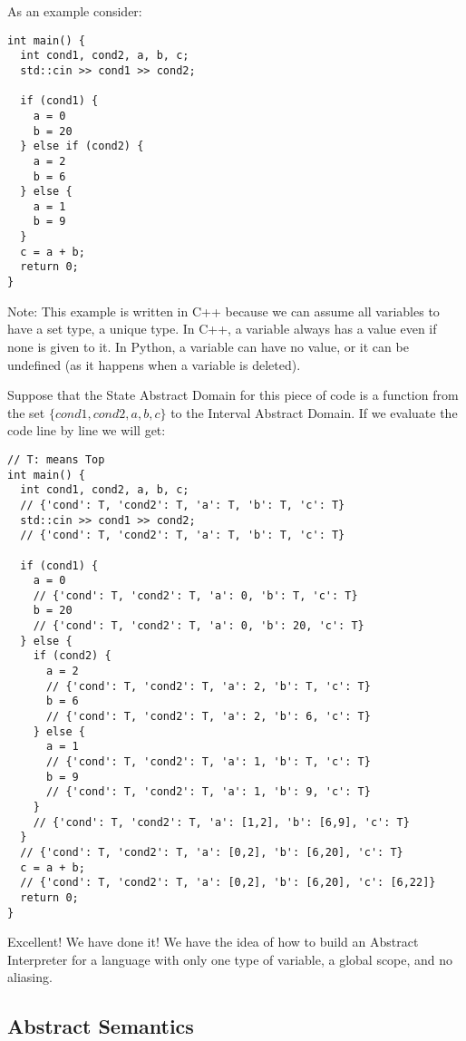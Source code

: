 As an example consider:

\begin{verbatim}
int main() {
  int cond1, cond2, a, b, c;
  std::cin >> cond1 >> cond2;

  if (cond1) {
    a = 0
    b = 20
  } else if (cond2) {
    a = 2
    b = 6
  } else {
    a = 1
    b = 9
  }
  c = a + b;
  return 0;
}
\end{verbatim}

Note: This example is written in C++ because we can assume all variables
to have a set type, a unique type. In C++, a variable always has a value
even if none is given to it. In Python, a variable can have no value, or
it can be undefined (as it happens when a variable is deleted).

Suppose that the State Abstract Domain for this piece of code is a
function from the set \(\{cond1, cond2, a, b, c\}\) to the Interval
Abstract Domain. If we evaluate the code line by line we will get:

\begin{verbatim}
// T: means Top
int main() {
  int cond1, cond2, a, b, c;
  // {'cond': T, 'cond2': T, 'a': T, 'b': T, 'c': T}
  std::cin >> cond1 >> cond2;
  // {'cond': T, 'cond2': T, 'a': T, 'b': T, 'c': T}

  if (cond1) {
    a = 0
    // {'cond': T, 'cond2': T, 'a': 0, 'b': T, 'c': T}
    b = 20
    // {'cond': T, 'cond2': T, 'a': 0, 'b': 20, 'c': T}
  } else {
    if (cond2) {
      a = 2
      // {'cond': T, 'cond2': T, 'a': 2, 'b': T, 'c': T}
      b = 6
      // {'cond': T, 'cond2': T, 'a': 2, 'b': 6, 'c': T}
    } else {
      a = 1
      // {'cond': T, 'cond2': T, 'a': 1, 'b': T, 'c': T}
      b = 9
      // {'cond': T, 'cond2': T, 'a': 1, 'b': 9, 'c': T}
    }
    // {'cond': T, 'cond2': T, 'a': [1,2], 'b': [6,9], 'c': T}
  }
  // {'cond': T, 'cond2': T, 'a': [0,2], 'b': [6,20], 'c': T}
  c = a + b;
  // {'cond': T, 'cond2': T, 'a': [0,2], 'b': [6,20], 'c': [6,22]}
  return 0;
}
\end{verbatim}

Excellent! We have done it! We have the idea of how to build an Abstract
Interpreter for a language with only one type of variable, a global
scope, and no aliasing.

\subsection{Abstract Semantics}\label{abstract-semantics}


